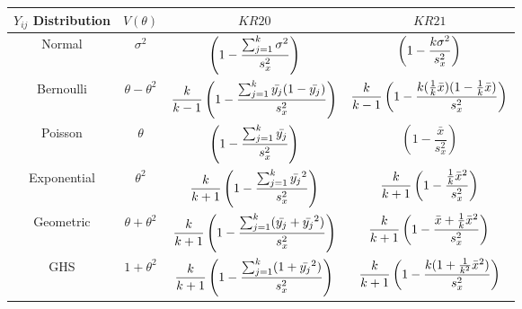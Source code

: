 \documentclass[12pt,epsfig]{article}
\newcommand{\changed}[1]{\textcolor{black}{#1}}
\newcommand{\testlength}{\changed{k}}%
\begin{document}
\begin{table}[h]
    \centering
    \begin{tabular}{ c  c   c  c } \hline
    $Y_{ij}$ Distribution& $V(\theta)$ & $ KR20$ & $KR21$ \\ \hline 
    \vspace{0.2in} Normal & $\sigma^2$ & $\left(1 - \dfrac{ \sum_{j = 1}^{\testlength} \sigma^2}{s^2_x}\right)$ & $\left(1 - \dfrac{\testlength \sigma^2}{s^2_x}\right)$   \\  
   \vspace{0.2in} Bernoulli & $\theta - \theta^2$ & $\dfrac{\testlength}{\testlength-1}\left(1 - \dfrac{ \sum_{j = 1}^{\testlength} \bar{y_j}(1 - \bar{y_j})}{s^2_x}\right)$ & $\dfrac{\testlength}{\testlength-1}\left(1 - \dfrac{\testlength (\frac{1}{\testlength} \bar{x})(1 - \frac{1}{\testlength} \bar{x})}{s^2_x}\right)$ \\
    \vspace{0.2in} Poisson & $\theta$ & $\left(1 - \dfrac{ \sum_{j = 1}^{\testlength} \bar{y_j}}{s^2_x}\right)$ & $\left(1 - \dfrac{\bar{x}}{s^2_x}\right)$ \\
  \vspace{0.2in} Exponential & $\theta^2$ & $\dfrac{\testlength}{\testlength+1}\left(1 - \dfrac{ \sum_{j = 1}^{\testlength} \bar{y_j}^2}{s^2_x}\right)$ & $\dfrac{\testlength}{\testlength+1}\left(1 - \dfrac{\frac{1}{\testlength} \bar{x}^2}{s^2_x}\right)$ \\
    \vspace{0.2in} Geometric & $\theta + \theta^2$ &  $\dfrac{\testlength}{\testlength+1}\left(1 - \dfrac{ \sum_{j = 1}^{\testlength} (\bar{y_j} + \bar{y_j}^2)}{s^2_x}\right)$ & $\dfrac{\testlength}{\testlength+1}\left(1 - \dfrac{\bar{x} + \frac{1}{\testlength} \bar{x}^2}{s^2_x}\right)$ \\
   \vspace{0.2in} GHS & $1 + \theta^2$ &  $\dfrac{\testlength}{\testlength+1}\left(1 - \dfrac{ \sum_{j = 1}^{\testlength} (1 + \bar{y_j}^2)}{s^2_x}\right)$ & $\dfrac{\testlength}{\testlength+1}\left(1 - \dfrac{\testlength (1 + \frac{1}{\testlength^2} \bar{x}^2)}{s^2_x}\right)$  \\ \hline
    \end{tabular}

\end{table}
\end{document}
